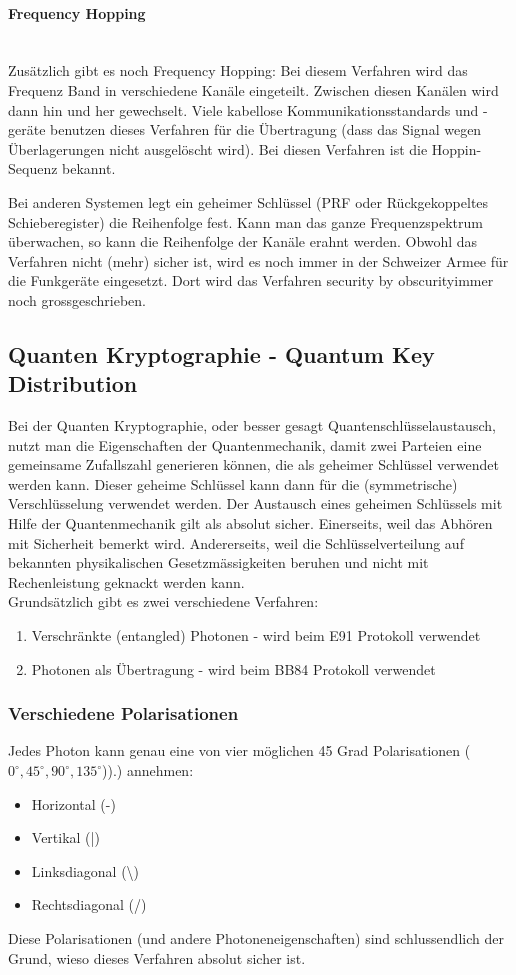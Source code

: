 \paragraph{Frequency Hopping}\hfill
\\
Zusätzlich gibt es noch Frequency Hopping: Bei diesem Verfahren wird das Frequenz Band in verschiedene Kanäle eingeteilt. Zwischen diesen Kanälen wird dann hin und her gewechselt. Viele kabellose Kommunikationsstandards und -geräte benutzen dieses Verfahren für die Übertragung (dass das Signal wegen Überlagerungen nicht ausgelöscht wird). Bei diesen Verfahren ist die Hoppin-Sequenz bekannt.

Bei anderen Systemen legt ein geheimer Schlüssel (PRF oder Rückgekoppeltes Schieberegister)  die Reihenfolge fest. Kann man das ganze Frequenzspektrum überwachen, so kann die Reihenfolge der Kanäle erahnt werden. Obwohl das Verfahren nicht (mehr) sicher ist, wird es noch immer in der Schweizer Armee für die Funkgeräte eingesetzt. Dort wird das Verfahren \grqq security by obscurity\grqq immer noch grossgeschrieben.

\subsection{Quanten Kryptographie - Quantum Key Distribution}
Bei der Quanten Kryptographie, oder besser gesagt Quantenschlüsselaustausch, nutzt man die Eigenschaften der Quantenmechanik, damit zwei Parteien eine gemeinsame Zufallszahl generieren können, die als geheimer Schlüssel verwendet werden kann. Dieser geheime Schlüssel kann dann für die (symmetrische) Verschlüsselung verwendet werden. Der Austausch eines geheimen Schlüssels mit Hilfe der Quantenmechanik gilt als absolut sicher. Einerseits, weil das Abhören mit Sicherheit bemerkt wird. Andererseits, weil die Schlüsselverteilung auf bekannten physikalischen Gesetzmässigkeiten beruhen und nicht mit Rechenleistung geknackt werden kann. 
\\
Grundsätzlich gibt es zwei verschiedene Verfahren:
\begin{enumerate}
    \item Verschränkte (entangled) Photonen - wird beim E91 Protokoll verwendet 
    \item Photonen als Übertragung - wird beim BB84 Protokoll verwendet
\end{enumerate}

\subsubsection{Verschiedene Polarisationen}
Jedes Photon kann genau eine von vier möglichen 45 Grad Polarisationen ($0^{\circ},45^{\circ},90^{\circ},135^{\circ}$)).) annehmen:
\begin{itemize}
    \item Horizontal (-)
    \item Vertikal (|)
    \item Linksdiagonal (\textbackslash)
    \item Rechtsdiagonal (/)
\end{itemize}
Diese Polarisationen (und andere Photoneneigenschaften) sind schlussendlich der Grund, wieso dieses Verfahren absolut sicher ist. 

